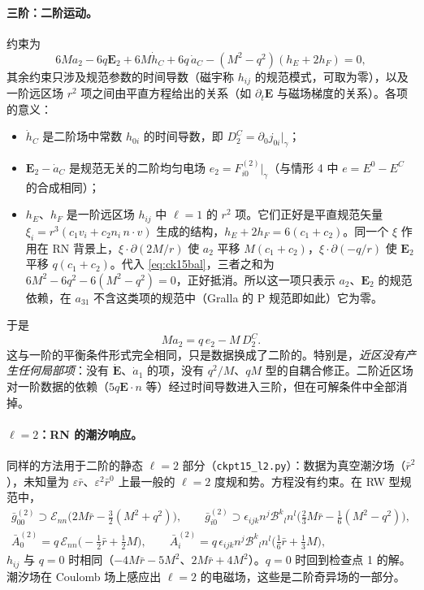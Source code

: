 \documentclass[11pt,a4paper]{ctexart}
\numberwithin{equation}{section}
\begin{document}
\paragraph{三阶：二阶运动。}约束为
\begin{equation}
6Ma_2-6q\boldsymbol E_2+6M\dot h_C+6q\,\dot a_C-(M^2-q^2)(h_E+2h_F)=0 ,
\label{eq:ck15bal}
\end{equation}
其余约束只涉及规范参数的时间导数（磁宇称 $h_{ij}$ 的规范模式，可取为零），以及一阶远区场 $r^2$ 项之间由平直方程给出的关系（如 $\partial_t\boldsymbol E$ 与磁场梯度的关系）。各项的意义：
\begin{itemize}
\item $\dot h_C$ 是二阶场中常数 $h_{0i}$ 的时间导数，即 $D^C_2=\partial_0j_{0i}|_\gamma$；
\item $\boldsymbol E_2-\dot a_C$ 是规范无关的二阶均匀电场 $e_2=F^{(2)}_{i0}|_\gamma$（与情形 4 中 $e=E^0-E^C$ 的合成相同）；
\item $h_E$、$h_F$ 是一阶远区场 $h_{ij}$ 中 $\ell=1$ 的 $r^2$ 项。它们正好是平直规范矢量 $\xi_i=r^3(c_1v_i+c_2n_i\,n\cdot v)$ 生成的结构，$h_E+2h_F=6(c_1+c_2)$。同一个 $\xi$ 作用在 RN 背景上，$\xi\cdot\partial(2M/r)$ 使 $a_2$ 平移 $M(c_1+c_2)$，$\xi\cdot\partial(-q/r)$ 使 $\boldsymbol E_2$ 平移 $q(c_1+c_2)$。代入 \eqref{eq:ck15bal}，三者之和为 $6M^2-6q^2-6(M^2-q^2)=0$，正好抵消。所以这一项只表示 $a_2$、$\boldsymbol E_2$ 的规范依赖，在 $a_{31}$ 不含这类项的规范中（Gralla 的 P 规范即如此）它为零。
\end{itemize}
于是
\begin{equation}
Ma_2=q\,e_2-M\,D^C_2 .
\label{eq:ck15a2}
\end{equation}
这与一阶的平衡条件形式完全相同，只是数据换成了二阶的。特别是，\emph{近区没有产生任何局部项}：没有 $\dot{\boldsymbol E}$、$\dot a_1$ 的项，没有 $q^2/M$、$qM$ 型的自耦合修正。二阶近区场对一阶数据的依赖（$5q\boldsymbol E\cdot n$ 等）经过时间导数进入三阶，但在可解条件中全部消掉。

\paragraph{$\ell=2$：RN 的潮汐响应。}同样的方法用于二阶的静态 $\ell=2$ 部分（\texttt{ckpt15\_l2.py}）：数据为真空潮汐场（$\bar r^2$），未知量为 $\varepsilon\bar r$、$\varepsilon^2\bar r^0$ 上最一般的 $\ell=2$ 度规和势。方程没有约束。在 RW 型规范中，
\begin{gather*}
\bar g^{(2)}_{00}\supset\mathcal E_{nn}\big(2M\bar r-\tfrac32(M^2+q^2)\big),\qquad
\bar g^{(2)}_{i0}\supset\epsilon_{ijk}n^j\mathcal B^k{}_ln^l\big(\tfrac23M\bar r-\tfrac16(M^2-q^2)\big),\\
\bar A^{(2)}_0=q\,\mathcal E_{nn}\big(-\tfrac12\bar r+\tfrac12M\big),\qquad
\bar A^{(2)}_i=q\,\epsilon_{ijk}n^j\mathcal B^k{}_ln^l\big(\tfrac16\bar r+\tfrac13M\big),
\end{gather*}
$h_{ij}$ 与 $q=0$ 时相同（$-4M\bar r-5M^2$、$2M\bar r+4M^2$）。$q=0$ 时回到检查点 1 的解。潮汐场在 Coulomb 场上感应出 $\ell=2$ 的电磁场，这些是二阶奇异场的一部分。
\end{document}
